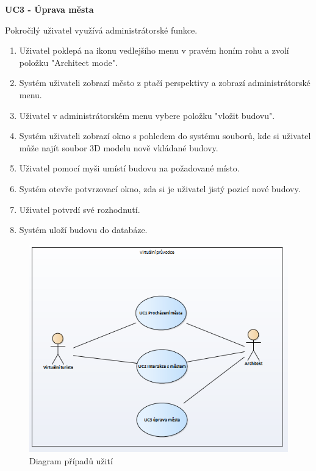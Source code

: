 \documentclass[thesis=B,czech]{FITthesis}[2012/06/26]
\begin{document}
\begin{description}
 		\item \textbf{UC3 - Úprava města}
 		
 		Pokročilý uživatel využívá administrátorské funkce.
 		\begin{enumerate}
    		\item Uživatel poklepá na ikonu vedlejšího menu v pravém honím rohu a zvolí položku "Architect mode".
    		\item Systém uživateli zobrazí město z ptačí perspektivy a zobrazí administrátorské menu.
    		\item Uživatel v administrátorském menu vybere položku "vložit budovu".
    		\item Systém uživateli zobrazí okno s pohledem do systému souborů, kde si uživatel může najít soubor 3D modelu nově vkládané budovy.
    		\item Uživatel pomocí myši umístí budovu na požadované místo.
    		\item Systém otevře potvrzovací okno, zda si je uživatel jistý pozicí nové budovy.
    		\item Uživatel potvrdí své rozhodnutí.
    		\item Systém uloží budovu do databáze.
 		\end{enumerate}
		
 		
 	\end{description}	
 	
 	\begin{figure}
  		\includegraphics{UCdiagram.png}
  		\caption{Diagram případů užití}
  		\label{fig:UCdiagram}
	\end{figure}
	
\end{document}

